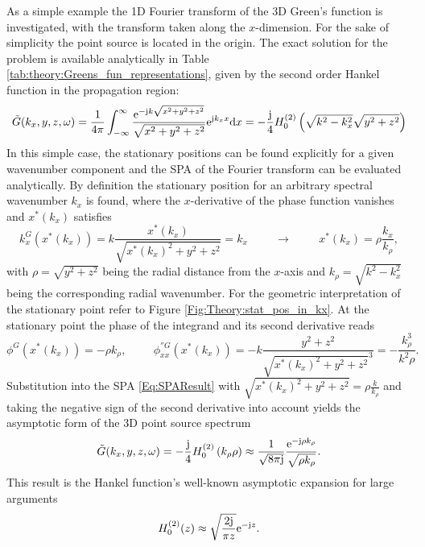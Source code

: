 As a simple example the 1D Fourier transform of the 3D Green's function is investigated, with the transform taken along the $x$-dimension.
For the sake of simplicity the point source is located in the origin.
The exact solution for the problem is available analytically in Table \eqref{tab:theory:Greens_fun_representations}, given by the second order Hankel function in the propagation region:
\begin{equation}
\tilde{G}(k_x,y,z,\omega) = \frac{1}{4\pi} \int_{-\infty}^{\infty} \frac{\mathrm{e}^{-\mathrm{j} k \sqrt{x^2 + y^2 + z^2}}}{\sqrt{x^2 + y^2 + z^2}} \mathrm{e}^{\mathrm{j} k_x x} \mathrm{d} x = 
-\frac{\mathrm{j}}{4} H_0^{(2)}\left( \sqrt{k^2- k_x^2} \sqrt{y^2 + z^2} \right)
\label{Eq:HF_approx:Greens_spectrum_defintion}
\end{equation}
In this simple case, the stationary positions can be found explicitly for a given wavenumber component and the SPA of the Fourier transform can be evaluated analytically. 
By definition the stationary position for an arbitrary spectral wavenumber $k_x$ is found, where the $x$-derivative of the phase function vanishes and $x^*(k_x)$ satisfies
\begin{equation}
k^G_x(x^*(k_x)) = 
k \frac{x^*(k_x)}{\sqrt{x^*(k_x)^2 + y^2 + z^2}} = k_x 
\hspace{1cm} \rightarrow \hspace{1cm} 
x^*(k_x) = \rho \frac{k_x}{k_{\rho}},
\label{eq:HF_approx:greens_spectrum_stat_point}
\end{equation}
with $\rho = \sqrt{y^2+z^2}$ being the radial distance from the $x$-axis and $k_{\rho} = \sqrt	{k^2-k_x^2}$ being the corresponding radial wavenumber.
For the geometric interpretation of the stationary point refer to Figure \ref{Fig:Theory:stat_pos_in_kx}.
At the stationary point the phase of the integrand and its second derivative reads
\begin{equation}
\phi^{G}(x^*(k_x)) = - \rho k_{\rho}, \hspace{1cm}
\phi^{''G}_{xx}(x^*(k_x)) =  -k \frac{y^2+z^2}{\sqrt{ x^*(k_x)^2 +y^2+z^2 }^3} = - \frac{k_{\rho}^3}{k^2 \rho}.
\end{equation}
Substitution into the SPA \eqref{Eq:SPAResult} with $\sqrt{x^*(k_x)^2 + y^2 + z^2} = \rho \frac{k}{k_{\rho}}$ and taking the negative sign of the second derivative into account yields the asymptotic form of the 3D point source spectrum
\begin{equation}
\tilde{G}(k_x,y,z,\omega) = -\frac{\mathrm{j}}{4} H_0^{(2)}\left( k_{\rho} \rho \right) \approx \frac{1}{\sqrt{8\pi \mathrm{j}}} \frac{\mathrm{e} ^{-\mathrm{j} \rho k_{\rho}}}{\sqrt{ \rho k_{\rho} }}.
\label{Eq:25D_WFS:3D_Greens_asymp_spectrum}
\end{equation}
This result is the Hankel function's well-known asymptotic expansion for large arguments \cite[10.17.6]{Olver:2010:NHMF}
\begin{equation}
H_0^{(2)}(z)\approx \sqrt{\frac{2 \mathrm{j}}{\pi z}} \mathrm{e}^{-\mathrm{j} z}.
\label{Eq:HF_approx:Hankel_asymptotic_form}
\end{equation}

